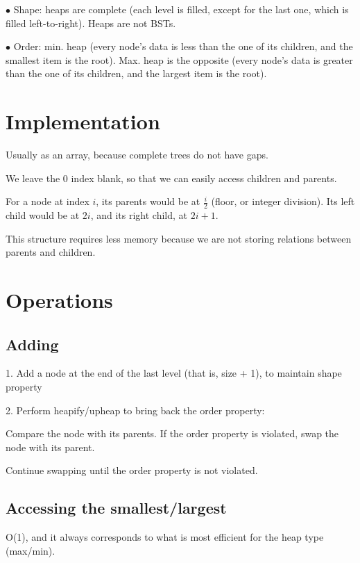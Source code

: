 \documentclass[english,openany]{book}
\begin{document}
	$\bullet$ Shape: heaps are complete (each level is filled, except for the last one, which is filled left-to-right). Heaps are not BSTs.

	$\bullet$ Order: min. heap (every node's data is less than the one of its children, and the smallest item is the root). Max. heap is the opposite (every node's data is greater than the one of its children, and the largest item is the root).\\

	\section{Implementation}

	Usually as an array, because complete trees do not have gaps.

	We leave the 0 index blank, so that we can easily access children and parents.

	For a node at index $i$, its parents would be at $\frac{i}{2}$ (floor, or integer division). Its left child would be at $2i$, and its right child, at $2i + 1$.

	This structure requires less memory because we are not storing relations between parents and children.\\

	\section{Operations}

	\subsection{Adding}

	1. Add a node at the end of the last level (that is, size + 1), to maintain shape property

	2. Perform heapify/upheap to bring back the order property:

	Compare the node with its parents. If the order property is violated, swap the node with its parent.

	Continue swapping until the order property is not violated.\\

	\subsection{Accessing the smallest/largest}

	O(1), and it always corresponds to what is most efficient for the heap type (max/min).\\
\end{document}
